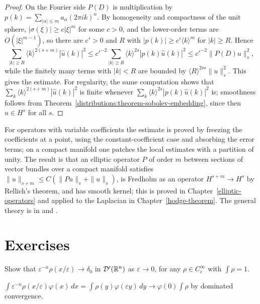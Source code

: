 \begin{proof}
On the Fourier side $P(D)$ is multiplication by $p(k) = \sum_{|\alpha| \leq m}a_\alpha(2\pi ik)^\alpha$. By homogeneity and compactness of the unit sphere, $|\sigma(\xi)| \geq c|\xi|^m$ for some $c > 0$, and the
lower-order terms are $O(|\xi|^{m-1})$, so there are $c' > 0$ and $R$ with $|p(k)| \geq c'\langle k\rangle^m$ for $|k| \geq R$. Hence
\[
\sum_{|k| \geq R}\langle k\rangle^{2(s+m)}|\hat u(k)|^2 \leq c'^{-2}\sum_{|k| \geq R}\langle k\rangle^{2s}|p(k)\hat u(k)|^2 \leq c'^{-2}\|P(D)u\|_s^2,
\]
while the finitely many terms with $|k| < R$ are bounded by $\langle R\rangle^{2m}\|u\|_s^2$. This gives the estimate. For regularity, the same computation shows that
$\sum_k\langle k\rangle^{2(s+m)}|\hat u(k)|^2$ is finite whenever $\sum_k\langle k\rangle^{2s}|p(k)\hat u(k)|^2$ is; smoothness follows from
Theorem~\ref{distributions:theorem-sobolev-embedding}, since then $u \in H^s$ for all $s$.
\end{proof}

\begin{remark}\label{distributions:remark-variable-coefficients}
For operators with variable coefficients the estimate is proved by freezing the coefficients at a point, using the constant-coefficient case and absorbing the error terms; on a compact manifold one patches
the local estimates with a partition of unity. The result is that an elliptic operator $P$ of order $m$ between sections of vector bundles over a compact manifold satisfies
$\|u\|_{s+m} \leq C(\|Pu\|_s + \|u\|_s)$, is Fredholm as an operator $H^{s+m} \to H^s$ by Rellich's theorem, and has smooth kernel; this is proved in Chapter~\ref{elliptic-operators} and applied to the
Laplacian in Chapter~\ref{hodge-theorem}. The general theory is in \cite[Chapters 7--10]{hormander-pdo1} and \cite[Chapter 6]{warner-foundations}.
\end{remark}

\section{Exercises}\label{distributions:section-exercises}

\begin{exercise}\label{distributions:exercise-delta-limit}
Show that $\varepsilon^{-n}\rho(x/\varepsilon) \to \delta_0$ in $\mathcal{D}'(\mathbb{R}^n)$ as $\varepsilon \to 0$, for any $\rho \in C_c^\infty$ with $\int\rho = 1$.
\end{exercise}

\begin{solution}
$\int\varepsilon^{-n}\rho(x/\varepsilon)\varphi(x)\,dx = \int\rho(y)\varphi(\varepsilon y)\,dy \to \varphi(0)\int\rho$ by dominated convergence.
\end{solution}

